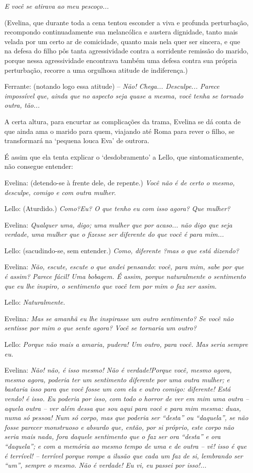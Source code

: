 \emph{E você se atirava ao meu pescoço...}

(Evelina, que durante toda a cena tentou esconder a viva e profunda
perturbação, recompondo continuadamente sua melancólica e austera
dignidade, tanto mais velada por um certo ar de comicidade, quanto mais
nela quer ser sincera, e que na defesa do filho pôs tanta agressividade
contra a sorridente remissão do marido, porque nessa agressividade
encontrava também uma defesa contra sua própria perturbação, recorre a
uma orgulhosa atitude de indiferença.)

Ferrante: (notando logo essa atitude) -- \emph{Não! Chega... Desculpe...
Parece impossível que, ainda que no aspecto seja quase a mesma, você
tenha se tornado outra, tão...}

A certa altura, para encurtar as complicações da trama, Evelina se dá
conta de que ainda ama o marido para quem, viajando até Roma para rever
o filho, se transformará na `pequena louca Eva' de outrora.

É assim que ela tenta explicar o `desdobramento' a Lello, que
sintomaticamente, não consegue entender:

Evelina: (detendo-se à frente dele, de repente.) \emph{Você não é de
certo o mesmo, desculpe, comigo e com outra mulher}.

Lello: (Aturdido.) \emph{Como?Eu? O que tenho eu com isso agora? Que
mulher?}

Evelina: \emph{Qualquer uma, digo; uma mulher que por acaso... não digo
que seja verdade, uma mulher que o fizesse ser diferente do que você é
para mim...}

Lello: (sacudindo-se, sem entender.) \emph{Como, diferente ?mas o que
está dizendo?}

Evelina: \emph{Não, escute, escute o que andei pensando}: \emph{você,
para mim, sabe por que é assim? Parece fácil! Uma bobagem. É assim,
porque naturalmente o sentimento que eu lhe inspiro, o sentimento que
você tem por mim o faz ser assim. }

Lello: \emph{Naturalmente.}

Evelina\emph{: Mas se amanhã eu lhe inspirasse um outro sentimento? Se
você não sentisse por mim o que sente agora? Você se tornaria um outro?}

Lello: \emph{Porque não mais a amaria, pudera! Um outro, para você. Mas
seria sempre eu. }

Evelina: \emph{Não! não, é isso mesmo! Não é verdade!Porque você, mesmo
agora, mesmo agora, poderia ter um sentimento diferente por uma outra
mulher; e bastaria isso para que você fosse um com ela e outro comigo:
diferente! Está vendo! é isso. Eu poderia por isso, com todo o horror de
ver em mim uma outra -- aquela outra -- ver além dessa que sou aqui para
você e para mim mesma: duas, numa só pessoa! Num só corpo, mas que
poderia ser ``desta'' ou ``daquela'', se não fosse parecer}
\emph{monstruoso e absurdo que, então, por si próprio, este corpo não
seria mais nada, fora daquele sentimento que o faz ser ora ``desta'' e
ora ``daquela''; e com a memória ao mesmo tempo de uma e de outra -- vê!
isso é que é terrível! -- terrível porque rompe a ilusão que cada um faz
de si, lembrando ser ``um'', sempre o mesmo. Não é verdade! Eu vi, eu
passei por isso!...}

